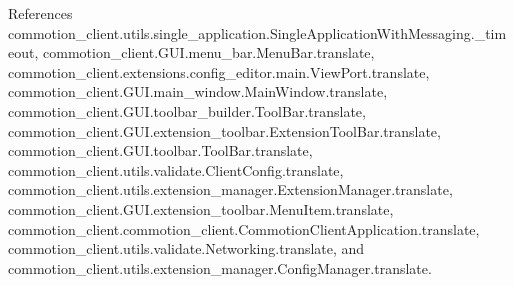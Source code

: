 References commotion\+\_\+client.\+utils.\+single\+\_\+application.\+Single\+Application\+With\+Messaging.\+\_\+timeout, commotion\+\_\+client.\+G\+U\+I.\+menu\+\_\+bar.\+Menu\+Bar.\+translate, commotion\+\_\+client.\+extensions.\+config\+\_\+editor.\+main.\+View\+Port.\+translate, commotion\+\_\+client.\+G\+U\+I.\+main\+\_\+window.\+Main\+Window.\+translate, commotion\+\_\+client.\+G\+U\+I.\+toolbar\+\_\+builder.\+Tool\+Bar.\+translate, commotion\+\_\+client.\+G\+U\+I.\+extension\+\_\+toolbar.\+Extension\+Tool\+Bar.\+translate, commotion\+\_\+client.\+G\+U\+I.\+toolbar.\+Tool\+Bar.\+translate, commotion\+\_\+client.\+utils.\+validate.\+Client\+Config.\+translate, commotion\+\_\+client.\+utils.\+extension\+\_\+manager.\+Extension\+Manager.\+translate, commotion\+\_\+client.\+G\+U\+I.\+extension\+\_\+toolbar.\+Menu\+Item.\+translate, commotion\+\_\+client.\+commotion\+\_\+client.\+Commotion\+Client\+Application.\+translate, commotion\+\_\+client.\+utils.\+validate.\+Networking.\+translate, and commotion\+\_\+client.\+utils.\+extension\+\_\+manager.\+Config\+Manager.\+translate.



